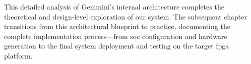 This detailed analysis of Gemmini's internal architecture completes the theoretical and design-level exploration of our system. The subsequent chapter transitions from this architectural blueprint to practice, documenting the complete implementation process—from \acrshort{soc} configuration and hardware generation to the final system deployment and testing on the target \acrshort{fpga} platform.
